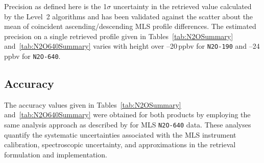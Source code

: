 Precision as defined here is the 1$\sigma$ uncertainty in the retrieved value calculated by the Level~2 algorithms and has been validated against the scatter about the mean of coincident ascending/descending MLS profile differences. The estimated precision on a single retrieved profile given in Tables~\ref{tab:N2OSummary} and~\ref{tab:N2O640Summary} varies with height over --20\,ppbv for \texttt{N2O-190} and --24\,ppbv for \texttt{N2O-640}.

\subsection{Accuracy}

The accuracy values given in Tables~\ref{tab:N2OSummary} and~\ref{tab:N2O640Summary} were obtained for both \thisv {} products by employing the same analysis approach as described by \citet{LambertEtal:2007} for MLS \texttt{N2O-640} \vii data. These analyses quantify the systematic uncertainties associated with the MLS instrument calibration, spectroscopic uncertainty, and approximations in the retrieval formulation and implementation.

